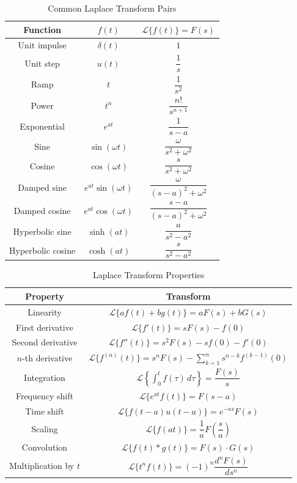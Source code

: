 \begin{table}[h]
\centering
\renewcommand{\arraystretch}{1.8}
\begin{tabular}{|c|c|c|}
\hline
\textbf{Function} & $f(t)$ & $\mathcal{L}\{f(t)\} = F(s)$ \\
\hline
Unit impulse & $\delta(t)$ & $1$ \\
\hline
Unit step & $u(t)$ & $\dfrac{1}{s}$ \\
\hline
Ramp & $t$ & $\dfrac{1}{s^2}$ \\
\hline
Power & $t^n$ & $\dfrac{n!}{s^{n+1}}$ \\
\hline
Exponential & $e^{at}$ & $\dfrac{1}{s-a}$ \\
\hline
Sine & $\sin(\omega t)$ & $\dfrac{\omega}{s^2 + \omega^2}$ \\
\hline
Cosine & $\cos(\omega t)$ & $\dfrac{s}{s^2 + \omega^2}$ \\
\hline
Damped sine & $e^{at}\sin(\omega t)$ & $\dfrac{\omega}{(s-a)^2 + \omega^2}$ \\
\hline
Damped cosine & $e^{at}\cos(\omega t)$ & $\dfrac{s-a}{(s-a)^2 + \omega^2}$ \\
\hline
Hyperbolic sine & $\sinh(at)$ & $\dfrac{a}{s^2 - a^2}$ \\
\hline
Hyperbolic cosine & $\cosh(at)$ & $\dfrac{s}{s^2 - a^2}$ \\
\hline
\end{tabular}
\caption{Common Laplace Transform Pairs}
\label{tab:laplace}
\end{table}

\begin{table}[h]
\centering
\renewcommand{\arraystretch}{1.8}
\begin{tabular}{|c|c|}
\hline
\textbf{Property} & \textbf{Transform} \\
\hline
Linearity & $\mathcal{L}\{af(t) + bg(t)\} = aF(s) + bG(s)$ \\
\hline
First derivative & $\mathcal{L}\{f'(t)\} = sF(s) - f(0)$ \\
\hline
Second derivative & $\mathcal{L}\{f''(t)\} = s^2F(s) - sf(0) - f'(0)$ \\
\hline
$n$-th derivative & $\mathcal{L}\{f^{(n)}(t)\} = s^n F(s) - \displaystyle\sum_{k=1}^{n} s^{n-k} f^{(k-1)}(0)$ \\
\hline
Integration & $\mathcal{L}\left\{\int_0^t f(\tau)\,d\tau\right\} = \dfrac{F(s)}{s}$ \\
\hline
Frequency shift & $\mathcal{L}\{e^{at}f(t)\} = F(s-a)$ \\
\hline
Time shift & $\mathcal{L}\{f(t-a)u(t-a)\} = e^{-as}F(s)$ \\
\hline
Scaling & $\mathcal{L}\{f(at)\} = \dfrac{1}{a}F\!\left(\dfrac{s}{a}\right)$ \\
\hline
Convolution & $\mathcal{L}\{f(t) * g(t)\} = F(s)\cdot G(s)$ \\
\hline
Multiplication by $t$ & $\mathcal{L}\{t^n f(t)\} = (-1)^n \dfrac{d^n F(s)}{ds^n}$ \\
\hline
\end{tabular}
\caption{Laplace Transform Properties}
\label{tab:laplace-props}
\end{table}

